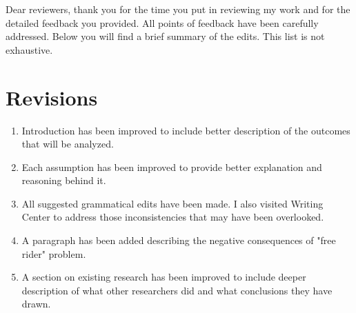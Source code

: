 \documentclass{article}
\begin{document}
	Dear reviewers, thank you for the time you put in reviewing my work and for the detailed feedback you provided. All points of feedback have been carefully addressed. Below you will find a brief summary of the edits. This list is not exhaustive. 

	\section*{Revisions}

		\begin{enumerate}
			\item 
				Introduction has been improved to include better description of the outcomes that will be analyzed.
			\item
				Each assumption has been improved to provide better explanation and reasoning behind it.
			\item
				All suggested grammatical edits have been made. I also visited Writing Center to address those inconsistencies that may have been overlooked.
			\item
				A paragraph has been added describing the negative consequences of "free rider" problem.
			\item
				A section on existing research has been improved to include deeper description of what other researchers did and what conclusions they have drawn.
		\end{enumerate}
\end{document}
